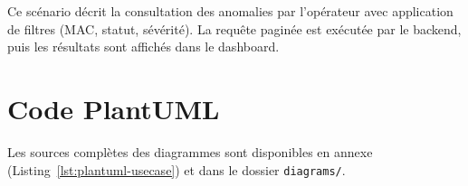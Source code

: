 Ce scénario décrit la consultation des anomalies par l'opérateur avec
application de filtres (MAC, statut, sévérité). La requête paginée est
exécutée par le backend, puis les résultats sont affichés dans le dashboard.


\section{Code PlantUML}

Les sources complètes des diagrammes sont disponibles en annexe (Listing~\ref{lst:plantuml-usecase}) et dans le dossier \texttt{diagrams/}.

